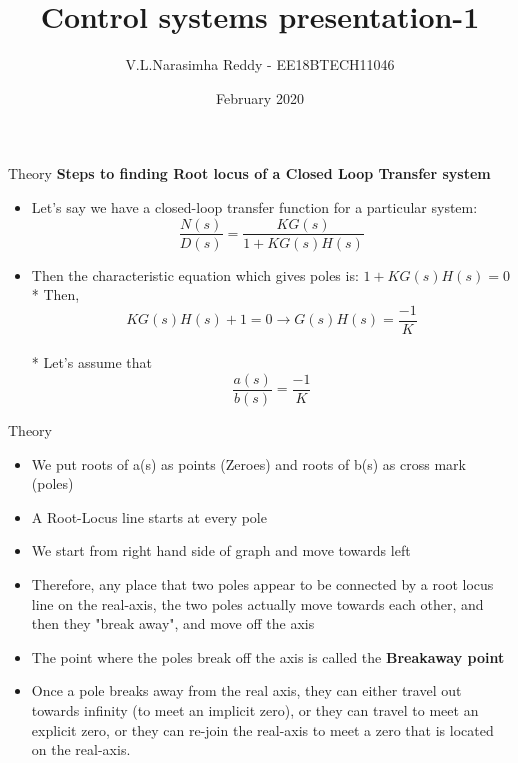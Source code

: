 \documentclass{beamer}
\title{Control systems presentation-1}
\author{V.L.Narasimha Reddy - EE18BTECH11046 }
\date{February 2020}
\begin{document}
\maketitle

\begin{frame}{Theory}
\textbf{Steps to finding Root locus of a Closed Loop Transfer system}
\begin{itemize}
    \item Let's say we have a closed-loop transfer function for a particular system:
    $$\frac{N(s)}{D(s)}=\frac{K G(s)}{1+K G(s) H(s)}$$
    \item Then the characteristic equation which gives poles is: $1+KG(s)H(s)=0$
    \\*
    \smallskip
    Then, $$K G(s) H(s)+1=0 \rightarrow G(s) H(s)=\frac{-1}{K}$$
    \\*
    \smallskip
    Let's assume that $$\frac{a(s)}{b(s)}=\frac{-1}{K}$$
\end{itemize}
    
\end{frame}

\begin{frame}{Theory}
    \begin{itemize}
        \item We put roots of a(s) as points (Zeroes) and roots of b(s) as cross mark (poles)
        \item A Root-Locus line starts at every pole
        \item We start from right hand side of graph and move towards left
        \item Therefore, any place that two poles appear to be connected by a root locus line on the real-axis, the two poles actually move towards each other, and then they "break away", and move off the axis
        \item The point where the poles break off the axis is called the \textbf{Breakaway point}
        \item Once a pole breaks away from the real axis, they can either travel out towards infinity (to meet an implicit zero), or they can travel to meet an explicit zero, or they can re-join the real-axis to meet a zero that is located on the real-axis.
    \end{itemize}
\end{frame}
\end{document}

